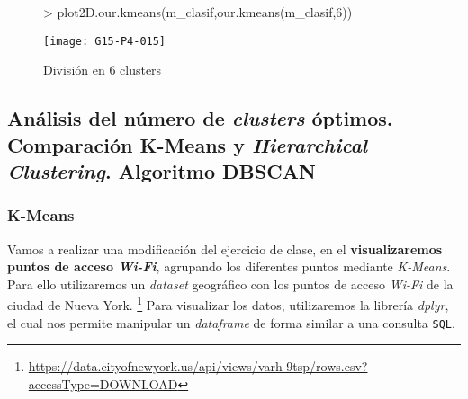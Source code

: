 \documentclass [a4paper] {article}
\begin{document}
\begin{figure}[htbp!]
\centering
\begin{Schunk}
\begin{Sinput}
> plot2D.our.kmeans(m_clasif,our.kmeans(m_clasif,6))
\end{Sinput}
\end{Schunk}
\texttt{[image: G15-P4-015]}
\caption{División en 6 clusters}
\end{figure}

\newpage
\subsection{Análisis del número de \textit{clusters} óptimos. Comparación K-Means y \textit{Hierarchical Clustering}. Algoritmo DBSCAN}
\subsubsection{K-Means}
Vamos a realizar una modificación del ejercicio de clase, en el \textbf{visualizaremos puntos de acceso \textit{Wi-Fi}}, agrupando los diferentes puntos mediante \textit{K-Means}. Para ello utilizaremos un \textit{dataset} geográfico con los puntos de acceso \textit{Wi-Fi} de la ciudad de Nueva York. \footnote{\url{https://data.cityofnewyork.us/api/views/varh-9tsp/rows.csv?accessType=DOWNLOAD}} Para visualizar los datos, utilizaremos la librería \textit{dplyr}, el cual nos permite manipular un \textit{dataframe} de forma similar a una consulta \texttt{SQL}.
\end{document}
